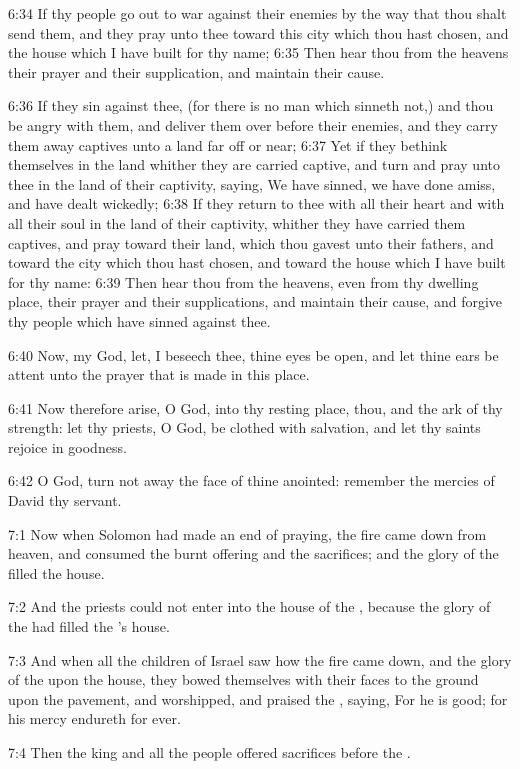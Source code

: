 6:34 If thy people go out to war against their enemies by the way that thou shalt send them, and they pray unto thee toward this city which thou hast chosen, and the house which I have built for thy name; 6:35 Then hear thou from the heavens their prayer and their supplication, and maintain their cause.

6:36 If they sin against thee, (for there is no man which sinneth not,) and thou be angry with them, and deliver them over before their enemies, and they carry them away captives unto a land far off or near; 6:37 Yet if they bethink themselves in the land whither they are carried captive, and turn and pray unto thee in the land of their captivity, saying, We have sinned, we have done amiss, and have dealt wickedly; 6:38 If they return to thee with all their heart and with all their soul in the land of their captivity, whither they have carried them captives, and pray toward their land, which thou gavest unto their fathers, and toward the city which thou hast chosen, and toward the house which I have built for thy name: 6:39 Then hear thou from the heavens, even from thy dwelling place, their prayer and their supplications, and maintain their cause, and forgive thy people which have sinned against thee.

6:40 Now, my God, let, I beseech thee, thine eyes be open, and let thine ears be attent unto the prayer that is made in this place.

6:41 Now therefore arise, O \LORD God, into thy resting place, thou, and the ark of thy strength: let thy priests, O \LORD God, be clothed with salvation, and let thy saints rejoice in goodness.

6:42 O \LORD God, turn not away the face of thine anointed: remember the mercies of David thy servant.

7:1 Now when Solomon had made an end of praying, the fire came down from heaven, and consumed the burnt offering and the sacrifices; and the glory of the \LORD filled the house.

7:2 And the priests could not enter into the house of the \LORD, because the glory of the \LORD had filled the \LORD's house.

7:3 And when all the children of Israel saw how the fire came down, and the glory of the \LORD upon the house, they bowed themselves with their faces to the ground upon the pavement, and worshipped, and praised the \LORD, saying, For he is good; for his mercy endureth for ever.

7:4 Then the king and all the people offered sacrifices before the \LORD.

